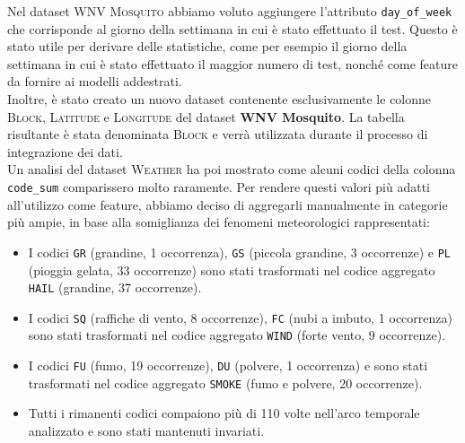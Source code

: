 Nel dataset \textsc{WNV Mosquito} abbiamo voluto aggiungere l'attributo 
\texttt{day\_of\_week} che corrisponde al giorno della settimana in cui è stato 
effettuato il test. Questo è stato utile per derivare delle statistiche, 
come per esempio il giorno della settimana in cui è stato effettuato il maggior 
numero di test, nonché come feature da fornire ai modelli addestrati.
\\

Inoltre, è stato creato un nuovo dataset contenente esclusivamente le colonne 
\textsc{Block}, \textsc{Latitude} e \textsc{Longitude} del dataset \textbf{WNV 
Mosquito}. La tabella risultante è stata denominata \textsc{Block} e verrà 
utilizzata durante il processo di integrazione dei dati.
\\

Un analisi del dataset \textsc{Weather} ha poi mostrato come alcuni codici 
della colonna \texttt{code\_sum} comparissero molto raramente. Per rendere 
questi valori più adatti all'utilizzo come feature, abbiamo deciso di 
aggregarli manualmente in categorie più ampie, in base alla somiglianza dei 
fenomeni meteorologici rappresentati:
\begin{itemize}
	\item I codici \texttt{GR} (grandine, 1 occorrenza), \texttt{GS} (piccola 
	grandine, 3 occorrenze) e \texttt{PL} (pioggia gelata, 33 occorrenze) sono 
	stati trasformati nel codice aggregato \texttt{HAIL} (grandine, 37 
	occorrenze).
	
	\item I codici \texttt{SQ} (raffiche di vento, 8 occorrenze), \texttt{FC} 
	(nubi a imbuto, 1 occorrenza) sono stati trasformati nel codice aggregato 
	\texttt{WIND} (forte vento, 9 occorrenze).
	
	\item I codici \texttt{FU} (fumo, 19 occorrenze), \texttt{DU} (polvere, 1 
	occorrenza) e sono stati trasformati nel codice aggregato \texttt{SMOKE} 
	(fumo e polvere, 20 occorrenze).
	
	\item Tutti i rimanenti codici compaiono più di 110 volte nell'arco 
	temporale analizzato e sono stati mantenuti invariati.
\end{itemize}

